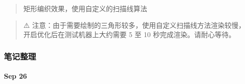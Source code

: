 \documentclass[
]{article}
\begin{document}
\begin{quote}
矩形编织效果，使用自定义的扫描线算法
\end{quote}

\begin{quote}
⚠️
注意：由于需要绘制的三角形较多，使用自定义扫描线方法渲染较慢，开启优化后在测试机器上大约需要
5 至 10 秒完成渲染。请耐心等待。
\end{quote}

\hypertarget{header-n179}{%
\subsubsection{笔记整理}\label{header-n179}}

\hypertarget{header-n180}{%
\paragraph{Sep 26}\label{header-n180}}
\end{document}
